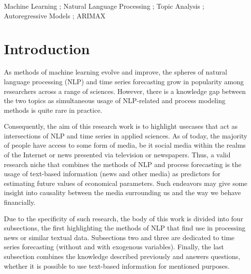 \documentclass[3p,times,procedia]{elsarticle}
\begin{document}
\begin{frontmatter}
\begin{keyword}
Machine Learning ; Natural Language Processing ; Topic Analysis ; Autoregressive Models ; ARIMAX




\end{keyword}
\end{frontmatter}




\section{Introduction}

As methods of machine learning evolve and improve, the spheres of natural language processing (NLP) and time series forecasting grow in popularity among researchers across a range of sciences. However, there is a knowledge gap between the two topics as simultaneous usage of NLP-related and process modeling methods is quite rare in practice.

Consequently, the aim of this research work is to highlight usecases that act as intersections of NLP and time series in applied sciences. As of today, the majority of people have access to some form of media, be it social media within the realms of the Internet or news presented via television or newspapers. Thus, a valid research niche that combines the methods of NLP and process forecasting is the usage of text-based information (news and other media) as predictors for estimating future values of economical parameters. Such endeavors may give some insight into causality between the media surrounding us and the way we behave financially.

Due to the specificity of such research, the body of this work is divided into four subsections, the first highlighting the methods of NLP that find use in processing news or similar textual data. Subsections two and three are dedicated to time series forecasting (without and with exogenous variables). Finally, the last subsection combines the knowledge described previously and answers questions, whether it is possible to use text-based information for mentioned purposes.
\end{document}
